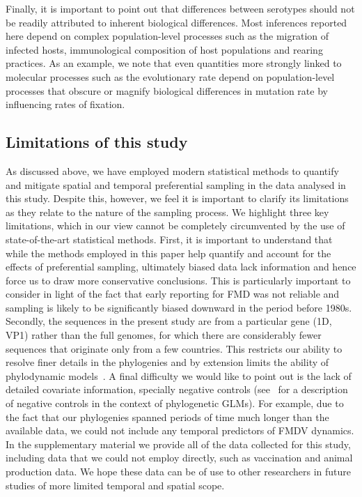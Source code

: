 \documentclass[10pt]{article}
\begin{document}
Finally, it is important to point out that differences between serotypes should not be readily attributed to inherent biological differences.
Most inferences reported here depend on complex population-level processes such as the migration of infected hosts, immunological composition of host populations and rearing practices.
As an example, we note that even quantities more strongly linked to molecular processes such as the evolutionary rate depend on population-level processes that obscure or magnify biological differences in mutation rate by influencing rates of fixation.

\subsection*{Limitations of this study}

As discussed above, we have employed modern statistical methods to quantify and mitigate spatial and temporal preferential sampling in the data analysed in this study.
Despite this, however, we feel it is important to clarify its limitations as they relate to the nature of the sampling process.
We highlight three key limitations, which in our view cannot be completely circumvented by the use of state-of-the-art statistical methods. 
First, it is important to understand that while the methods employed in this paper help quantify and account for the effects of preferential sampling, ultimately biased data lack information and hence force us to draw more conservative conclusions.
This is particularly important to consider in light of the fact that early reporting for FMD was not reliable and sampling is likely to be significantly biased downward in the period before 1980s.
Secondly, the sequences in the present study are from a particular gene (1D, VP1) rather than the full genomes, for which there are considerably fewer sequences that originate only from a few countries.
This restricts our ability to resolve finer details in the phylogenies and by extension limits the ability of phylodynamic models~\citep{Valdazo2012,Dudas2019}.
A final difficulty we would like to point out is the lack of detailed covariate information, specially negative controls (see~\cite{Dellicour2018} for a description of negative controls in the context of phylogenetic GLMs).
For example, due to the fact that our phylogenies spanned periods of time much longer than the available data, we could not include any temporal predictors of FMDV dynamics. %
In the supplementary material we provide all of the data collected for this study, including data that we could not employ directly, such as vaccination and animal production data.
We hope these data can be of use to other researchers in future studies of more limited temporal and spatial scope.
\end{document}
